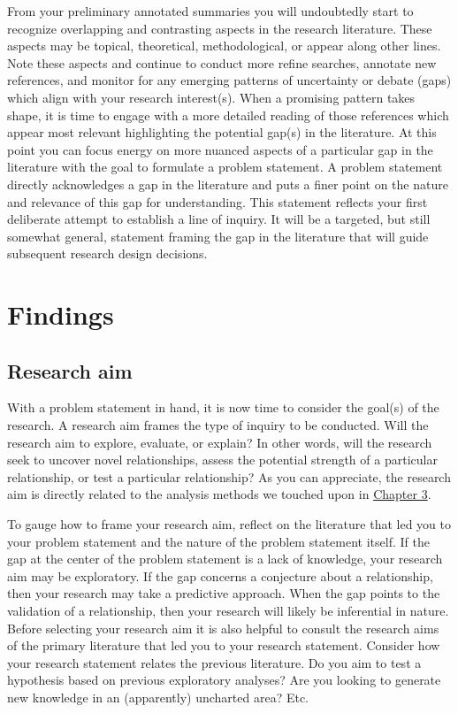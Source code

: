\documentclass[
  letterpaper,
]{latex/krantz}
\begin{document}
From your preliminary annotated summaries you will undoubtedly start to
recognize overlapping and contrasting aspects in the research
literature. These aspects may be topical, theoretical, methodological,
or appear along other lines. Note these aspects and continue to conduct
more refine searches, annotate new references, and monitor for any
emerging patterns of uncertainty or debate (gaps) which align with your
research interest(s). When a promising pattern takes shape, it is time
to engage with a more detailed reading of those references which appear
most relevant highlighting the potential gap(s) in the literature. At
this point you can focus energy on more nuanced aspects of a particular
gap in the literature with the goal to formulate a problem statement. A
problem statement directly acknowledges a gap in the literature and puts
a finer point on the nature and relevance of this gap for understanding.
This statement reflects your first deliberate attempt to establish a
line of inquiry. It will be a targeted, but still somewhat general,
statement framing the gap in the literature that will guide subsequent
research design decisions.

\hypertarget{findings}{%
\section{Findings}\label{findings}}

\hypertarget{research-aim}{%
\subsection{Research aim}\label{research-aim}}

With a problem statement in hand, it is now time to consider the goal(s)
of the research. A research aim frames the type of inquiry to be
conducted. Will the research aim to explore, evaluate, or explain? In
other words, will the research seek to uncover novel relationships,
assess the potential strength of a particular relationship, or test a
particular relationship? As you can appreciate, the research aim is
directly related to the analysis methods we touched upon in
\protect\hyperlink{sec-approaching-analysis}{Chapter 3}.

To gauge how to frame your research aim, reflect on the literature that
led you to your problem statement and the nature of the problem
statement itself. If the gap at the center of the problem statement is a
lack of knowledge, your research aim may be exploratory. If the gap
concerns a conjecture about a relationship, then your research may take
a predictive approach. When the gap points to the validation of a
relationship, then your research will likely be inferential in nature.
Before selecting your research aim it is also helpful to consult the
research aims of the primary literature that led you to your research
statement. Consider how your research statement relates the previous
literature. Do you aim to test a hypothesis based on previous
exploratory analyses? Are you looking to generate new knowledge in an
(apparently) uncharted area? Etc.
\end{document}
